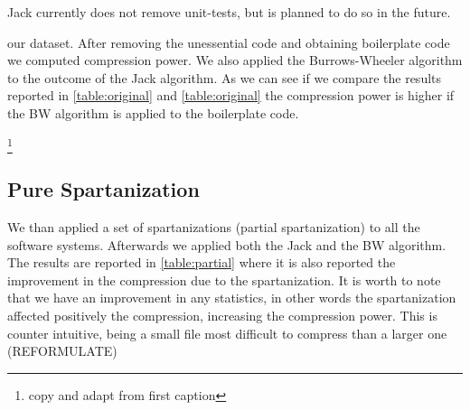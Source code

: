 Jack currently does not remove unit-tests, but is planned to do so in the
future.

our dataset. After removing the unessential code and obtaining boilerplate code
we computed compression power. We also applied the Burrows-Wheeler algorithm to
the outcome of the Jack algorithm. As we can see if we compare the results
reported in \cref{table:original} and \cref{table:original} the compression
power is higher if the BW algorithm is applied to the boilerplate code.

\begin{table}
  \matteo\footnote{copy and adapt from first caption}
  \caption{The results of the compression using the Jack algorithm alone and
  both Jack and Burrows-Wheeler algorithms combined}
  \label{table:original}
  \par\vspace{10pt plus 6pt minus 4pt}
  \centering
\end{table}


\subsection{Pure Spartanization}

We than applied a set of spartanizations (partial spartanization) to all the
software systems. Afterwards we applied both the Jack and the BW algorithm.
The results are reported in \cref{table:partial} where it is also
reported the improvement in the compression due to the spartanization. It is
worth to note that we have an improvement in any statistics, in other words the
spartanization affected positively the compression, increasing the compression
power. This is counter intuitive, being a small file most difficult to
compress than a larger one (REFORMULATE)

